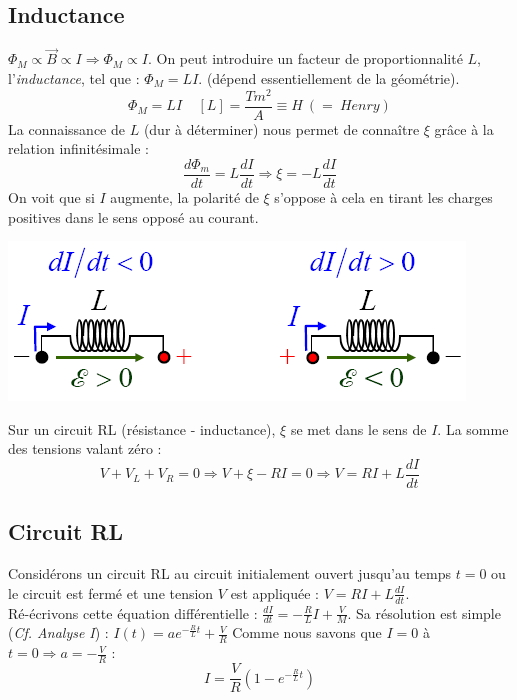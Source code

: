 \documentclass	[11pt, a4paper, openany]{book}
\begin{document}
\subsection{Inductance}
$\Phi_M \propto \vec{B} \propto I \Rightarrow \Phi_M \propto I$. On peut introduire un facteur de proportionnalité $L$, l'\textit{inductance}, tel que : $\Phi_M = LI$. (dépend essentiellement de la géométrie).
\begin{equation}
\Phi_M = LI\ \ \ \ \ [L] = \frac{Tm^2}{A} \equiv H\ (=\ Henry)
\end{equation}
La connaissance de $L$ (dur à déterminer) nous permet de connaître $\xi$ grâce à la relation infinitésimale :
\begin{equation}
\frac{d\Phi_m}{dt} = L \frac{dI}{dt} \Rightarrow \xi = -L\frac{dI}{dt}
\end{equation}
On voit que si $I$ augmente, la polarité de $\xi$ s'oppose à cela en tirant les charges positives dans le sens opposé au courant.
\begin{center}
\includegraphics[scale=0.50]{em/image22.png}\\
\end{center}
Sur un circuit RL (résistance - inductance), $\xi$ se met dans le sens de $I$. La somme des tensions valant zéro : 
\begin{equation}
V + V_L + V_R = 0 \Rightarrow V + \xi - RI = 0 \Rightarrow V = RI + L\frac{dI}{dt}
\end{equation}

\subsection{Circuit RL}
Considérons un circuit RL au circuit initialement ouvert jusqu'au temps $t = 0$ ou le circuit est fermé et une tension $V$ est appliquée : $V = RI + L\frac{dI}{dt}$.\\
Ré-écrivons cette équation différentielle : $\frac{dI}{dt} = -\frac{R}{L}I + \frac{V}{M}$. Sa résolution est simple (\textit{Cf. Analyse I}) :
$I(t) = ae^{-\frac{R}{L}t} + \frac{V}{R}$
Comme nous savons que $I = 0$ à $t = 0 \Rightarrow a= - \frac{V}{R}$ :
\begin{equation}
I = \frac{V}{R}\left(1-e^{-\frac{R}{L}t}\right)
\end{equation}
\end{document}
